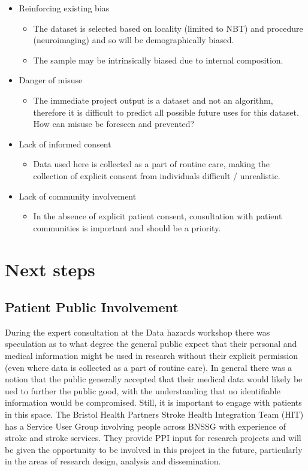 \documentclass{article}
\begin{document}
\begin{itemize}
\item Reinforcing existing bias
  \begin{itemize}
  \item The dataset is selected based on locality (limited to NBT)
    and procedure (neuroimaging) and so will be demographically
    biased.
  \item The sample may be intrinsically biased due to internal composition.
  \end{itemize}
\item Danger of misuse
  \begin{itemize}
  \item The immediate project output is a dataset and not an
    algorithm, therefore it is difficult to predict all possible
    future uses for this dataset. How can misuse be foreseen and prevented?
  \end{itemize}
\item Lack of informed consent
  \begin{itemize}
  \item Data used here is collected as a part of routine care, making
    the collection of explicit consent from individuals difficult / unrealistic.
  \end{itemize}     
\item Lack of community involvement
  \begin{itemize}
  \item In the absence of explicit patient consent, consultation with
    patient communities is important and should be a priority.
  \end{itemize}     
\end{itemize}


\section{Next steps}


\subsection{Patient Public Involvement}


During the expert consultation at the Data hazards workshop there was speculation as to what degree the general public expect that
their personal and medical information might be used in research
without their explicit permission (even where data is collected as a
part of routine care).
In general there was a notion that the public generally accepted that
their medical data would likely be ued to further the public good,
with the understanding that no identifiable information would be
compromised. Still, it is important to engage with patients in this
space. The Bristol Health Partners Stroke Health Integration Team
(HIT) has a Service User Group involving people across BNSSG with
experience of stroke and stroke services.
They provide PPI input for research projects and will be given the
opportunity to be involved in this project in the future,
particularly in the areas of research design, analysis and
dissemination.
\end{document}
